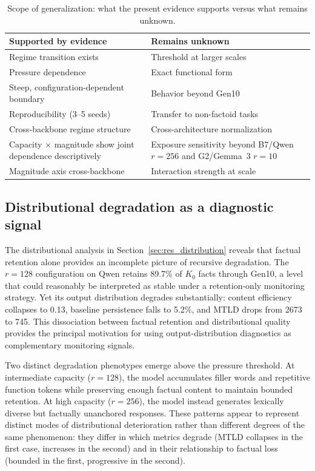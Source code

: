 \documentclass[a4paper,fleqn]{cas-dc}
\newif\ifshowchanges
\newcommand{\rev}[1]{\ifshowchanges{\color{blue}#1}\else{#1}\fi}
\renewcommand{\arraystretch}{1.8}
\begin{document}
\begin{table}[tp]
\caption{Scope of generalization: what the present evidence supports versus
what remains unknown.}\label{tab:generalization}
\footnotesize
\renewcommand{\arraystretch}{1.4}
\begin{tabular}{@{}p{3.6cm}p{3.6cm}@{}}
\toprule
\textbf{Supported by evidence} & \textbf{Remains unknown} \\
\midrule
Regime transition exists & Threshold at larger scales \\
\addlinespace
Pressure dependence & Exact functional form \\
\addlinespace
Steep, configuration-dependent boundary & Behavior beyond Gen10 \\
\addlinespace
Reproducibility (3--5 seeds) & Transfer to non-factoid tasks \\
\addlinespace
Cross-backbone regime structure & Cross-architecture normalization \\
\addlinespace
Capacity $\times$ magnitude \rev{show joint dependence descriptively} & \rev{Exposure sensitivity beyond B7/Qwen $r=256$ and G2/Gemma~3 $r=10$} \\
\addlinespace
Magnitude axis cross-backbone & Interaction strength at scale \\
\bottomrule
\end{tabular}
\end{table}

\subsection{Distributional degradation as a diagnostic signal}\label{sec:disc_drift}

The distributional analysis in Section~\ref{sec:res_distribution} reveals that
factual retention alone provides an incomplete picture of recursive degradation.
The $r=128$ configuration on Qwen retains 89.7\% of $K_0$ facts through Gen10,
a level that could reasonably be interpreted as stable under a retention-only
monitoring strategy. Yet its output distribution degrades substantially: content
efficiency collapses to 0.13, baseline persistence falls to 5.2\%, and MTLD
drops from 2673 to 745. This dissociation between factual retention and
distributional quality provides the principal motivation for using
output-distribution diagnostics as complementary monitoring signals.

Two distinct degradation phenotypes emerge above the pressure threshold. At
intermediate capacity ($r=128$), the model accumulates filler words and
repetitive function tokens while preserving enough factual content to maintain
bounded retention. At high capacity ($r=256$), the model instead generates
lexically diverse but factually unanchored responses. These patterns appear to
represent distinct modes of distributional deterioration rather than different
degrees of the same phenomenon: they differ in which metrics degrade (MTLD
collapses in the first case, increases in the second) and in their relationship
to factual loss (bounded in the first, progressive in the second).
\end{document}
